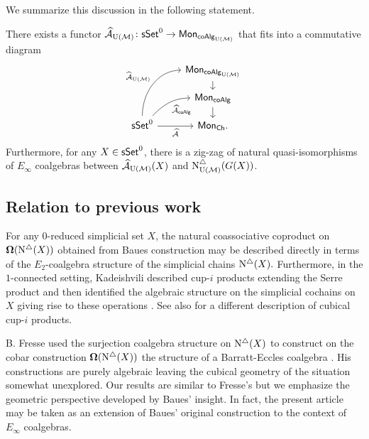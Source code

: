 We summarize this discussion in the following statement.

\begin{theorem} \label{t:2nd main thm in the intro} There exists a functor $\operatorname{\mathcal{\widehat{A}}}_{\mathrm{U}(\mathcal{M})} \colon \mathsf{sSet}^0 \to \mathsf{Mon}_{\mathsf{coAlg}_{\mathrm{U}(\mathcal{M})}}$ that fits into a commutative diagram
	\begin{equation*}
	\begin{tikzcd}[row sep=small]
	& \Mon_{\coAlg_\UM} \arrow[d] \\
	& \Mon_{\coAlg} \arrow[d] \\
	\sSet^0
	\arrow[r, "\Ahat"', ]
	\arrow[ru, "\Ahat_{\coAlg}"', out=45, in=180] 
	\arrow[ruu, "\widehat{\A}_\UM", out=90, in=180]
	& \Mon_{\Ch}.
	\end{tikzcd}
	\end{equation*}
	Furthermore, for any $X \in \mathsf{sSet}^0$, there is a zig-zag of natural quasi-isomorphisms of $E_{\infty}$ coalgebras between $\operatorname{\mathcal{\widehat{A}}}_{\mathrm{U}(\mathcal{M})}(X)$ and $\operatorname{N^{\triangle}_{{\mathrm{U}(\mathcal{M})}}}(G(X))$.
\end{theorem}


\subsection*{Relation to previous work}

For any $0$-reduced simplicial set $X$, the natural coassociative coproduct on $\operatorname{\mathbf{\Omega}} (\operatorname{N^{\triangle}} (X))$ obtained from Baues construction may be described directly in terms of the $E_2$-coalgebra structure of the simplicial chains $\operatorname{N^{\triangle}}(X).$ Furthermore, in the $1$-connected setting, Kadeishvili described cup-$i$ products extending the Serre product and then identified the algebraic structure on the simplicial cochains on $X$ giving rise to these operations \cite{kadeishvili1999coproducts, kadeishvili2003cup-i}.
See also \cite{pilarczyk2016cubical} for a different description of cubical cup-$i$ products.

B. Fresse used the surjection coalgebra structure on $\operatorname{N^{\triangle}}(X)$ to construct on the cobar construction $\operatorname{\mathbf{\Omega}}(\operatorname{N^{\triangle}}(X))$ the  structure of a Barratt-Eccles coalgebra \cite{fresse2003hopf}.
His constructions are purely algebraic leaving the cubical geometry of the situation somewhat unexplored.
Our results are similar to Fresse's but we emphasize the geometric perspective developed by Baues' insight.
In fact, the present article may be taken as an extension of Baues' original construction to the context of $E_{\infty}$ coalgebras.

